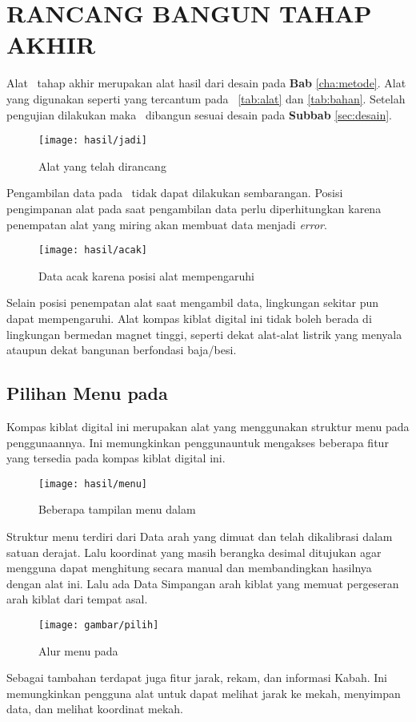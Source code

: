 \chapter{RANCANG BANGUN TAHAP AKHIR}\label{cha:rancang}
Alat \alat\ tahap akhir merupakan alat hasil dari  desain pada \textbf{Bab} \ref{cha:metode}. Alat yang digunakan seperti yang tercantum pada \tabel\ \ref{tab:alat} dan \ref{tab:bahan}. Setelah pengujian dilakukan maka \alat\ dibangun sesuai desain pada \textbf{Subbab} \ref{sec:desain}.
\begin{figure}
\centering
\texttt{[image: hasil/jadi]}
\caption{Alat yang telah dirancang}
\end{figure}
Pengambilan data pada \alat\ tidak dapat dilakukan sembarangan. Posisi pengimpanan alat pada saat pengambilan data perlu diperhitungkan karena penempatan alat yang miring akan membuat data menjadi \textit{error}. 
\begin{figure}
\centering
\texttt{[image: hasil/acak]}
\caption{Data acak karena posisi alat mempengaruhi}
\end{figure}
Selain posisi penempatan alat saat mengambil data, lingkungan sekitar pun dapat mempengaruhi. Alat kompas kiblat digital ini tidak boleh berada di lingkungan bermedan magnet tinggi, seperti dekat alat-alat listrik yang menyala ataupun dekat bangunan berfondasi baja/besi.

\section{Pilihan Menu pada \Alat}
Kompas kiblat digital ini merupakan alat yang menggunakan struktur menu pada penggunaannya. Ini memungkinkan penggunauntuk mengakses beberapa fitur yang tersedia pada kompas kiblat digital ini.
\begin{figure}
\centering
\texttt{[image: hasil/menu]}
\caption{Beberapa tampilan menu dalam \alat}
\end{figure}
Struktur menu terdiri dari Data arah yang dimuat dan telah dikalibrasi dalam satuan derajat. Lalu koordinat yang masih berangka desimal ditujukan agar mengguna dapat menghitung secara manual dan membandingkan hasilnya dengan alat ini. Lalu ada Data Simpangan arah kiblat yang memuat pergeseran arah kiblat dari tempat asal. 
\begin{figure}
\texttt{[image: gambar/pilih]}
\caption{Alur menu pada \alat}
\end{figure}
Sebagai tambahan terdapat juga fitur jarak, rekam, dan informasi Kabah. Ini memungkinkan pengguna alat untuk dapat melihat jarak ke mekah, menyimpan data, dan melihat koordinat mekah.
